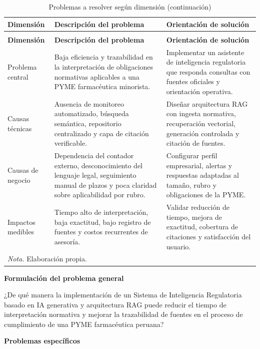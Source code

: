 \documentclass[12pt,a4paper,oneside]{report}
\begin{document}
\begin{longtable}{@{}p{}p{}p{}@{}}
\caption{Problemas a resolver según dimensión}\label{tab:problemas-resolver}\\
\toprule
\textbf{Dimensión} & \textbf{Descripción del problema} & \textbf{Orientación de solución} \\
\midrule
\endfirsthead
\caption[]{Problemas a resolver según dimensión (continuación)}\\
\toprule
\textbf{Dimensión} & \textbf{Descripción del problema} & \textbf{Orientación de solución} \\
\midrule
\endhead
Problema central & Baja eficiencia y trazabilidad en la interpretación de obligaciones normativas aplicables a una PYME farmacéutica minorista. & Implementar un asistente de inteligencia regulatoria que responda consultas con fuentes oficiales y orientación operativa. \\
Causas técnicas & Ausencia de monitoreo automatizado, búsqueda semántica, repositorio centralizado y capa de citación verificable. & Diseñar arquitectura RAG con ingesta normativa, recuperación vectorial, generación controlada y citación de fuentes. \\
Causas de negocio & Dependencia del contador externo, desconocimiento del lenguaje legal, seguimiento manual de plazos y poca claridad sobre aplicabilidad por rubro. & Configurar perfil empresarial, alertas y respuestas adaptadas al tamaño, rubro y obligaciones de la PYME. \\
Impactos medibles & Tiempo alto de interpretación, baja exactitud, bajo registro de fuentes y costos recurrentes de asesoría. & Validar reducción de tiempo, mejora de exactitud, cobertura de citaciones y satisfacción del usuario. \\
\bottomrule
\multicolumn{3}{p{0.94\textwidth}}{\normalsize \textit{Nota.} Elaboración propia.}\\
\end{longtable}

\textbf{Formulación del problema general}

¿De qué manera la implementación de un Sistema de Inteligencia Regulatoria basado en IA generativa y arquitectura RAG puede reducir el tiempo de interpretación normativa y mejorar la trazabilidad de fuentes en el proceso de cumplimiento de una PYME farmacéutica peruana?

\textbf{Problemas específicos}
\end{document}
